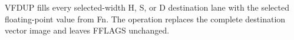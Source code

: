 VFDUP fills every selected-width H, S, or D destination lane with the selected
floating-point value from Fn. The operation replaces the complete destination
vector image and leaves FFLAGS unchanged.
